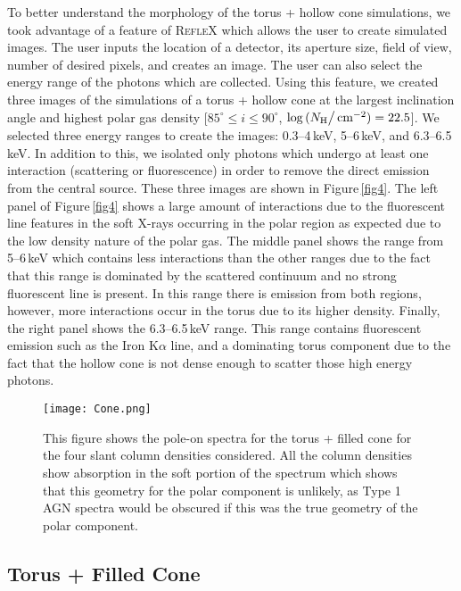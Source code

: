 \documentclass[fleqn,usenatbib]{mnras}
\begin{document}
            To better understand the morphology of the torus + hollow cone simulations, we took advantage of a feature of \textsc{RefleX} which allows the user to create simulated images. The user inputs the location of a detector, its aperture size, field of view, number of desired pixels, and creates an image. The user can also select the energy range of the photons which are collected. Using this feature, we created three images of the simulations of a torus + hollow cone at the largest inclination angle and highest polar gas density [$85^{\circ} \leq i \leq 90^{\circ}$, $\log{(N_{\text{H}}\big /\text{\,cm$^{-2}$}}) = 22.5$]. We selected three energy ranges to create the images: 0.3--4\,keV, 5--6\,keV, and 6.3--6.5\,keV. In addition to this, we isolated only photons which undergo at least one interaction (scattering or fluorescence) in order to remove the direct emission from the central source. These three images are shown in Figure\,\ref{fig4}. The left panel of Figure\,\ref{fig4} shows a large amount of interactions due to the fluorescent line features in the soft X-rays occurring in the polar region as expected due to the low density nature of the polar gas. The middle panel shows the range from 5--6\,keV which contains less interactions than the other ranges due to the fact that this range is dominated by the scattered continuum and no strong fluorescent line is present. In this range there is emission from both regions, however, more interactions occur in the torus due to its higher density. Finally, the right panel shows the 6.3--6.5\,keV range. This range contains fluorescent emission such as the Iron K$\alpha$ line, and a dominating torus component due to the fact that the hollow cone is not dense enough to scatter those high energy photons. 
            
        \begin{figure}
            \centering
            \texttt{[image: Cone.png]}
            \caption{This figure shows the pole-on spectra for the torus + filled cone for the four slant column densities considered. All the column densities show absorption in the soft portion of the spectrum which shows that this geometry for the polar component is unlikely, as Type 1 AGN spectra would be obscured if this was the true geometry of the polar component.}
            \label{figCone}
        \end{figure}
        
    \subsection{Torus + Filled Cone}
    
\end{document}

